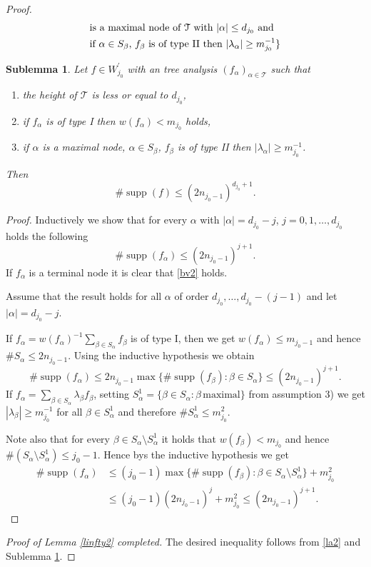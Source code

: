\documentclass[a4paper]{amsart}
\theoremstyle{plain}
\newtheorem{sublemma}[theorem]{Sublemma}
\newcommand{\mc}{\mathcal}
\newcommand{\fa}{f_{\alpha}}
\newcommand{\fb}{f_{\beta}}
\DeclareMathOperator{\supp}{supp}
\begin{document}
\begin{proof}
\begin{align}
&\text{is a maximal node of $\mc{T}$ with $\vert \alpha\vert\leq d_{j_0}$ and}
\notag\\
&\text{if $\alpha\in S_{\beta}$, $\fb$ is of type II then $\vert\lambda_{\alpha}\vert\geq
m_{j_0}^{-1}$}\}\label{la2}
\end{align}
\begin{sublemma}\label{sl4.7}
Let  $f\in W_{j_0}^{\prime}$ with an tree analysis
$(\fa)_{\alpha\in\mc{T}}$  such that
\begin{enumerate}
\item[1)] the height of $\mc{T}$ is less or  equal to $d_{j_0}$, \item[2)] if $\fa$ is of
type I then $w(\fa)<m_{j_0}$ holds, \item[3)] if $\alpha$ is a maximal node, $\alpha\in
S_{\beta}$, $\fb$ is of type II then $\vert\lambda_{\alpha}\vert\geq m_{j_0}^{-1}$.
\end{enumerate}
Then
$$\#\supp(f)\leq (2n_{j_0-1})^{d_{j_{0}}+1}.$$
\end{sublemma}
\begin{proof}
Inductively we show that for every $\alpha$ with $\vert \alpha\vert=d_{j_0}-j$, $j=0,1,\dots,d_{j_0}$ holds the following
\begin{equation}
\label{bv2}\#\supp(\fa)\leq (2n_{j_0-1})^{j+1}.
\end{equation}
If $\fa$ is a terminal node it is clear that \eqref{bv2} holds.

Assume that the result holds for all $\alpha$ of order $d_{j_0},\dots,d_{j_0}-(j-1)$ and let $\vert \alpha\vert=d_{j_0}-j$.

If $\fa=w(\fa)^{-1}\sum_{\beta\in S_{\alpha}}\fb$ is of type I, then  we get $w(\fa)\leq
m_{j_0-1}$ and hence $\# S_{\alpha}\leq 2n_{j_0-1}$. Using the  inductive hypothesis  we
obtain $$ \#\supp(\fa)\leq 2n_{j_0-1}\max\{\#\supp(\fb):\beta\in S_{\alpha}\}\leq
(2n_{j_0-1})^{j+1}.
$$
If $\fa=\sum_{\beta\in S_{\alpha}}\lambda_{\beta}\fb$, setting
$S_{\alpha}^{1}=\{\beta\in S_{\alpha}:\beta\,\text{maximal}\}$
from  assumption 3)  we get $|\lambda_{\beta}|\geq m_{j_0}^{-1}$
for all $\beta\in S_{\alpha}^{1}$ and therefore $\#
S_{\alpha}^{1}\leq m_{j_0}^{2}$.

Note also that for every $\beta\in S_{\alpha}\setminus S_{\alpha}^{1}$ it holds that
$w(\fb)<m_{j_0}$ and hence  $\# (S_{\alpha}\setminus S_{\alpha}^{1})\leq j_{0}-1$. Hence
bys the inductive hypothesis we get
\begin{align*}
\#\supp(\fa)&\leq (j_0-1)\max\{\#\supp(\fb):\beta\in S_{\alpha}\setminus S_{\alpha}^{1}\}+m_{j_0}^{2}\\
&\leq
(j_0-1)(2n_{j_0-1})^{j}+m_{j_0}^{2}\leq
 (2n_{j_0-1})^{j+1}.
\end{align*}
\end{proof}
\textit{Proof of Lemma \ref{linfty2} completed.} The desired inequality follows from
\eqref{la2}  and Sublemma  \ref{sl4.7}.
\end{proof}
\end{document}
